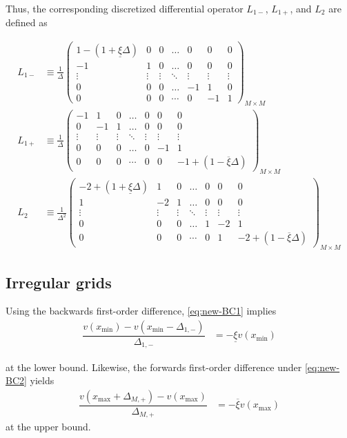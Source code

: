 \documentclass[11pt]{article}
\begin{document}
Thus, the corresponding discretized differential operator $L_{1-}$, $L_{1+}$, and $L_2$ are defined as 

\begin{align}
L_{1-} &\equiv \frac{1}{\Delta}\begin{pmatrix}
1 - (1 + \underline{\xi} \Delta) &0&0&\dots&0&0&0\\
-1&1&0&\dots&0&0&0\\
\vdots&\vdots&\vdots&\ddots&\vdots&\vdots&\vdots\\
0&0&0&\dots&-1&1&0\\
0&0&0&\cdots&0&-1&1
\end{pmatrix}_{M\times M}\label{eq:L-1-regular} \\
L_{1+} &\equiv \frac{1}{\Delta}\begin{pmatrix}
-1&1&0&\dots&0&0&0\\
0&-1&1&\dots&0&0&0\\
\vdots&\vdots&\vdots&\ddots&\vdots&\vdots&\vdots\\
0&0&0&\dots&0&-1&1\\
0&0&0&\cdots&0&0&-1+(1-\overline{\xi} \Delta)
\end{pmatrix}_{M\times M}\label{eq:L-1-plus-regular} \\
L_2 &\equiv \frac{1}{\Delta^2}\begin{pmatrix}
-2 + (1 + \underline{\xi}\Delta) &1&0&\dots&0&0&0\\
1&-2&1&\dots&0&0&0\\
\vdots&\vdots&\vdots&\ddots&\vdots&\vdots&\vdots\\
0&0&0&\dots&1&-2&1\\
0&0&0&\cdots&0&1&-2 + (1- \overline{\xi}\Delta)
\end{pmatrix}_{M\times M}\label{eq:L-2-regular}
\end{align}

\subsection{Irregular grids}
Using the backwards first-order difference, \eqref{eq:new-BC1} implies
\begin{align}
\dfrac{v({x_{\min}}) - v({x_{\min}}-\Delta_{1, -})}{\Delta_{1, -}} &= - \underline{\xi} v({x_{\min}})
\end{align}

at the lower bound. Likewise, the forwards first-order difference under \eqref{eq:new-BC2} yields
\begin{align}
\dfrac{v({x_{\max}} + \Delta_{M, +}) - v( {x_{\max}})}{\Delta_{M, +}} &= - \overline{\xi} v({x_{\max}})
\end{align}
at the upper bound.
\end{document}
